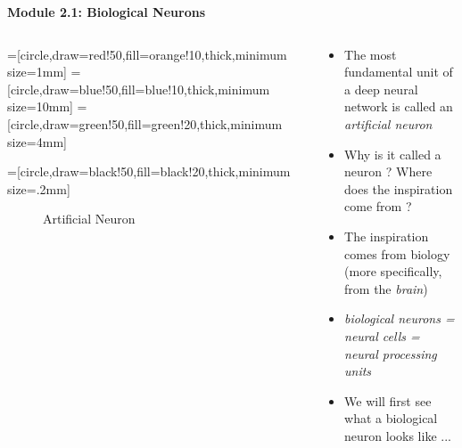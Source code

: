 \documentclass[serif, aspectratio=169]{beamer}
\newcommand\myheading[1]{%
\par\bigskip
{\Large\bfseries#1}\par\smallskip}
\begin{document}
  \begin{frame}
    \myheading{Module 2.1: Biological Neurons}
  \end{frame}
  \begin{frame}

  \begin{columns}

  \begin{overlayarea}{\textwidth}{\textheight}

  =[circle,draw=red!50,fill=orange!10,thick,minimum size=1mm]
  =[circle,draw=blue!50,fill=blue!10,thick,minimum size=10mm]
  =[circle,draw=green!50,fill=green!20,thick,minimum size=4mm]

  =[circle,draw=black!50,fill=black!20,thick,minimum size=.2mm]

  \begin{figure}
  \centering
  \caption{Artificial Neuron}
  \end{figure}
  \end{overlayarea}

  \begin{overlayarea}{\textwidth}{\textheight}

  \begin{itemize}
    \justifying
    \item<1-> The most fundamental unit of a deep neural network is called an \textit{artificial neuron}
    \item<2-> Why is it called a neuron ? Where does the inspiration come from ?
    \item<3-> The inspiration comes from biology (more specifically, from the \textit{brain})
    \item<4-> \textit{biological neurons = neural cells = neural processing units}
    \item<5-> We will first see what a biological neuron looks like ...

  \end{itemize}
  \end{overlayarea}
  \end{columns}
  \end{frame}
\end{document}
